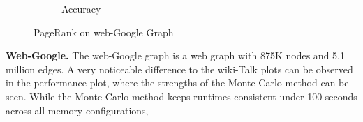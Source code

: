 \begin{figure}[H]
\begin{subfigure}[t]{0.5\linewidth}
        \caption{Accuracy}
        \label{fig:wikigibhrs}
    \end{subfigure}
    \caption{PageRank on web-Google Graph}
    \label{fig:wiki-comparison}
\end{figure}

\textbf{Web-Google.} The web-Google graph is a web graph with 875K nodes and 5.1 million edges. A very noticeable difference to the wiki-Talk plots can be observed in the performance plot, where the strengths of the Monte Carlo method can be seen. While the Monte Carlo method keeps runtimes consistent under 100 seconds across all memory configurations, \par



